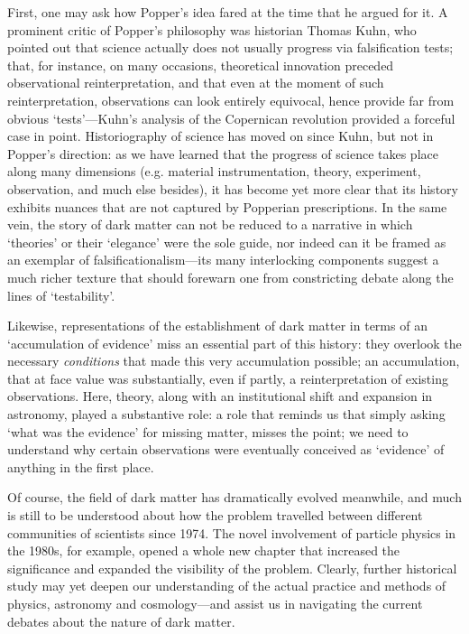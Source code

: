 \documentclass{naturefig}
\begin{document}
First, one may ask how Popper's idea fared at the time that he argued for it. A prominent critic of Popper's philosophy was historian Thomas Kuhn, who pointed out that science actually does not usually progress via falsification tests; that, for instance,  on many occasions, theoretical innovation preceded observational reinterpretation, and that even at the moment of such reinterpretation, observations can look entirely equivocal, hence provide far from obvious `tests'---Kuhn's analysis of the Copernican revolution provided a forceful case in point.\cite{Kuhn1970} Historiography of science has moved on since Kuhn, but not in Popper's direction: as we have learned that the progress of science takes place along many dimensions (e.g. material instrumentation, theory, experiment, observation, and much else besides), it has become yet more clear that its history exhibits nuances that are not captured by Popperian prescriptions. In the same vein, the story of dark matter can not be reduced to a narrative in which `theories' or their `elegance' were the sole guide, nor indeed can it be framed as an exemplar of falsificationalism---its many interlocking components suggest a much richer texture that should forewarn one from constricting debate along the lines of `testability'.

Likewise, representations of the establishment of dark matter in terms of an `accumulation of evidence' miss an essential part of this history: they overlook the necessary \textit{conditions} that made this very accumulation possible; an accumulation, that at face value was substantially, even if partly, a reinterpretation of existing observations. Here, theory, along with an institutional shift and expansion in astronomy, played a substantive role: a role that reminds us that simply asking `what was the evidence' for missing matter, misses the point; we need to understand why certain observations were eventually conceived as `evidence' of anything in the first place.

Of course, the field of dark matter has dramatically evolved meanwhile, and much is still to be understood about how the problem travelled between different communities of scientists since 1974. The novel involvement of particle physics in the 1980s, for example, opened a whole new chapter that increased the significance and expanded the visibility of the problem. Clearly, further historical study may yet deepen our understanding of the actual practice and methods of physics, astronomy and cosmology---and assist us in navigating the current debates about the nature of dark matter.
\end{document}

